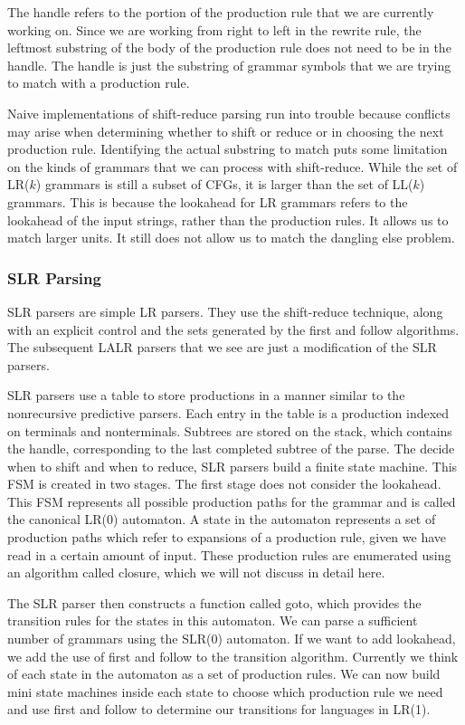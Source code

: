 \documentclass[a4paper, 10pt]{article}
\begin{document}
The handle refers to the portion of the production rule that we are currently working on. Since we are working from right to left in the rewrite rule, the leftmost substring of the body of the production rule does not need to be in the handle. The handle is just the substring of grammar symbols that we are trying to match with a production rule.

Naive implementations of shift-reduce parsing run into trouble because conflicts may arise when determining whether to shift or reduce or in choosing the next production rule. Identifying the actual substring to match puts some limitation on the kinds of grammars that we can process with shift-reduce. While the set of LR($k$) grammars is still a subset of CFGs, it is larger than the set of LL($k$) grammars. This is because the lookahead for LR grammars refers to the lookahead of the input strings, rather than the production rules. It allows us to match larger units. It still does not allow us to match the dangling else problem.

\subsubsection{SLR Parsing}\label{sec:slr}
SLR parsers are simple LR parsers. They use the shift-reduce technique, along with an explicit control and the sets generated by the {\sc first} and {\sc follow} algorithms. The subsequent LALR parsers that we see are just a modification of the SLR parsers.

SLR parsers use a table to store productions in a manner similar to the nonrecursive predictive parsers. Each entry in the table is a production indexed on terminals and nonterminals. Subtrees are stored on the stack, which contains the handle, corresponding to the last completed subtree of the parse. The decide when to shift and when to reduce, SLR parsers build a finite state machine. This FSM is created in two stages. The first stage does not consider the lookahead. This FSM represents all possible production paths for the grammar and is called the canonical LR(0) automaton. A state in the automaton represents a set of production paths which refer to expansions of a production rule, given we have read in a certain amount of input. These production rules are enumerated using an algorithm called {\sc closure}, which we will not discuss in detail here. 

The SLR parser then constructs a function called {\sc goto}, which provides the transition rules for the states in this automaton. We can parse a sufficient number of grammars using the SLR(0) automaton. If we want to add lookahead, we add the use of {\sc first} and {\sc follow} to the transition algorithm. Currently we think of each state in the automaton as a set of production rules. We can now build mini state machines inside each state to choose which production rule we need and use {\sc first} and {\sc follow} to determine our transitions for languages in LR(1).
\end{document}
